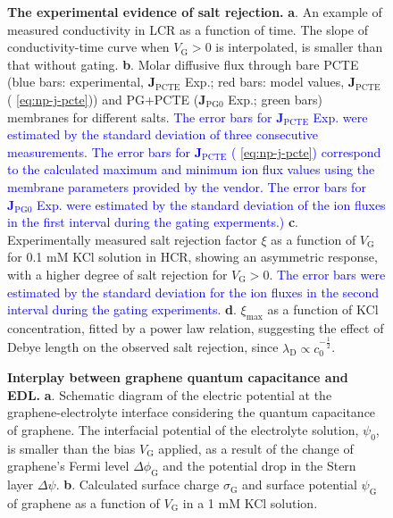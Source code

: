 \begin{figure}[H]
  \centering
  \caption{ \textbf{The experimental evidence of salt rejection.}
    \textbf{a}. An example of measured conductivity in LCR as a
    function of time. The slope of conductivity-time curve when
    $V_{\mathrm{G}}>0$ is interpolated, is smaller than that without
    gating. \textbf{b}. Molar diffusive flux through bare PCTE (blue
    bars: experimental, $\boldsymbol{J}_{\mathrm{PCTE}}$ Exp.; red
    bars: model values, $\boldsymbol{J}_{\mathrm{PCTE}}$
    ( \autoref{eq:np-j-pcte})) and PG+PCTE
    ($\boldsymbol{J}_{\mathrm{PG0}}$ Exp.; green bars) membranes for
    different salts. \textcolor{blue}{The error bars for
      $\boldsymbol{J}_{\mathrm{PCTE}}$ Exp. were estimated by the
      standard deviation of three consecutive measurements. The error bars
      for $\boldsymbol{J}_{\mathrm{PCTE}}$ ( \autoref{eq:np-j-pcte})
      correspond to the calculated maximum and minimum ion flux values
      using the membrane parameters provided by the vendor. The error
      bars for $\boldsymbol{J}_{\mathrm{PG0}}$ Exp. were estimated by
      the standard deviation of the ion fluxes in the first interval
      during the gating experments.)}  \textbf{c}. Experimentally
    measured salt rejection factor $\xi$ as a function of
    $V_{\mathrm{G}}$ for 0.1 mM KCl solution in HCR, showing an
    asymmetric response, with a higher degree of salt rejection for
    $V_{\mathrm{G}}>0$. \textcolor{blue}{The error bars were estimated
      by the standard deviation for the ion fluxes in the second
      interval during the gating experiments.}
    \textbf{d}. $\xi_{\mathrm{max}}$ as a function of KCl
    concentration, fitted by a power law relation, suggesting the
    effect of Debye length on the observed salt rejection, since
    $\lambda_{\mathrm{D}} \propto c_{0}^{-\frac{1}{2}}$.}
  \label{fig:np-2} 
\end{figure}

\begin{figure}[H]
  \centering
  \caption{\textbf{Interplay between graphene quantum capacitance and
      EDL.} \textbf{a}. Schematic diagram of the electric
    potential at the graphene-electrolyte interface considering the
    quantum capacitance of graphene. The interfacial potential of the
    electrolyte solution, $\psi_{0}$, is smaller than the bias
    $V_{\mathrm{G}}$ applied, as a result of the change of graphene's
    Fermi level $\Delta \phi_{\mathrm{G}}$ and the potential drop in
    the Stern layer $\Delta \psi$. \textbf{b}. Calculated surface
    charge $\sigma_{\mathrm{G}}$ and surface potential
    $\psi_{\mathrm{G}}$ of graphene as a function of $V_{\mathrm{G}}$
    in a 1 mM KCl solution. }
  \label{fig:np-3}
\end{figure}

